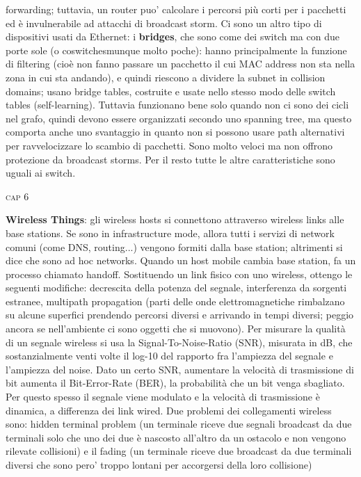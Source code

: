 \documentclass[a4paper,10pt]{article} %
\renewcommand{\b}[1]{%
    {\textbf{#1}}}
\begin{document}
forwarding; tuttavia, un router puo' calcolare i percorsi più corti per i pacchetti ed è invulnerabile ad attacchi di broadcast storm. Ci sono un altro tipo di dispositivi usati da Ethernet: i \b{bridges}, che sono come dei switch ma con due porte sole (o coswitchesmunque molto poche): hanno principalmente la funzione di filtering (cioè non fanno passare un pacchetto il cui MAC address non sta nella zona in cui sta andando), e quindi riescono a dividere la subnet in collision domains; usano bridge tables, costruite e usate nello stesso modo delle switch tables (self-learning). Tuttavia funzionano bene solo quando non ci sono dei cicli nel grafo, quindi devono essere organizzati secondo uno spanning tree, ma questo comporta anche uno svantaggio in quanto non si possono usare path alternativi per ravvelocizzare lo scambio di pacchetti. Sono molto veloci ma non offrono protezione da broadcast storms. Per il resto tutte le altre caratteristiche sono uguali ai switch.


\vspace{3pt}
\centerline{\textsc{ \normalsize {cap 6}}}
\vspace{3pt}

\b{Wireless Things}: gli wireless hosts si connettono attraverso wireless links alle base stations. Se sono in infrastructure mode, allora tutti i servizi di network comuni (come DNS, routing...) vengono formiti dalla base station; altrimenti si dice che sono ad hoc networks. Quando un host mobile cambia base station, fa un processo chiamato handoff. Sostituendo un link fisico con uno wireless, ottengo le seguenti modifiche: decrescita della potenza del segnale, interferenza da sorgenti estranee, multipath propagation (parti delle onde elettromagnetiche rimbalzano su alcune superfici prendendo percorsi diversi e arrivando in tempi diversi; peggio ancora se nell'ambiente ci sono oggetti che si muovono). Per misurare la qualità di un segnale wireless si usa la Signal-To-Noise-Ratio (SNR), misurata in dB, che sostanzialmente venti volte il log-10 del rapporto fra l'ampiezza del segnale e l'ampiezza del noise. Dato un certo SNR, aumentare la velocità di trasmissione di bit aumenta il Bit-Error-Rate (BER), la probabilità che un bit venga sbagliato. Per questo spesso il segnale viene modulato e la velocità di trasmissione è dinamica, a differenza dei link wired. Due problemi dei collegamenti wireless sono: hidden terminal problem (un terminale riceve due segnali broadcast da due terminali solo che uno dei due è nascosto all'altro da un ostacolo e non vengono rilevate collisioni) e il fading (un terminale riceve due broadcast da due terminali diversi che sono pero' troppo lontani per accorgersi della loro collisione)
\end{document}
